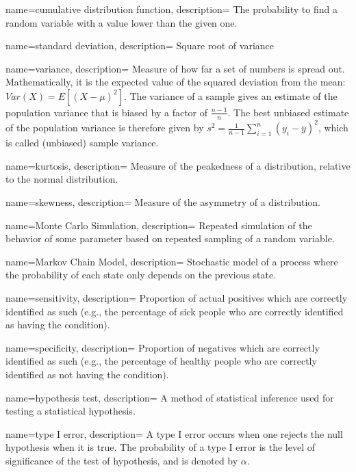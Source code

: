 {
    name=cumulative distribution function,
    description={ The probability to find a random variable with a value lower than the
    given one.}
}

{
    name=standard deviation,
    description={ Square root of variance}
}

{
    name=variance,
    description={ Measure of how far a set of numbers is spread out. Mathematically, it is
    the expected value of the squared deviation from the mean:
    $Var(X)=E[(X-\mu)^2]$. The variance of a sample gives an estimate of the
    population variance that is biased by a factor of $\frac{n-1}{n}$. The
    best unbiased estimate of the population variance is therefore given by
    $s^2 = \frac{1}{n-1} \sum_{i=1}^n \left(y_i - \overline{y} \right)^2$,
    which is called (unbiased) sample variance.}
}

{
    name=kurtosis,
    description={ Measure of the peakedness of a distribution, relative to the
    normal distribution.}
}

{
    name=skewness,
    description={ Measure of the asymmetry of a distribution.}
}

{
    name=Monte Carlo Simulation,
    description={ Repeated simulation of the behavior of some parameter based on repeated
    sampling of a random variable. }
}


{
    name=Markov Chain Model,
    description={ Stochastic model of a process where the probability of each state only
    depends on the previous state.}
}

{
    name=sensitivity,
    description={ Proportion of actual positives which are correctly identified as such
    (e.g., the percentage of sick people who are correctly identified as
    having the condition).}
}

{
    name=specificity,
    description={ Proportion of negatives which are correctly identified as such (e.g.,
     the percentage of healthy people who are correctly identified as not
     having the condition).}
}

{
    name=hypothesis test,
    description={ A method of statistical inference used for testing a statistical
    hypothesis.}
}

{
    name=type I error,
    description={ A type I error occurs when one rejects the null hypothesis when it is
    true. The probability of a type I error is the level of significance of
    the test of hypothesis, and is denoted by $\alpha$.}
}

